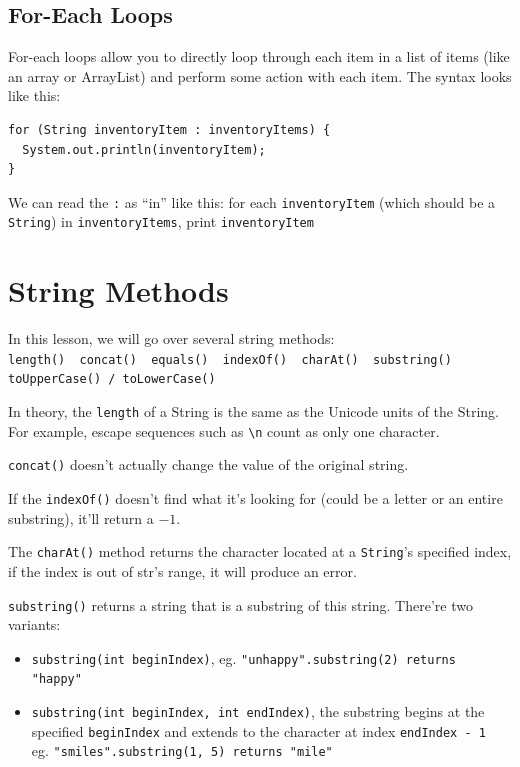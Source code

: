 \documentclass[a4paper, 12pt]{article}
\begin{document}
\subsection{For-Each Loops}
For-each loops allow you to directly loop through each item in a list of items (like an array or ArrayList) and perform some action with each item. The syntax looks like this:
\begin{verbatim}
for (String inventoryItem : inventoryItems) {
  System.out.println(inventoryItem);
}
\end{verbatim}
We can read the \verb|:| as ``in'' like this: for each \verb|inventoryItem| (which should be a \verb|String|) in \verb|inventoryItems|, print \verb|inventoryItem|


\section{String Methods}
In this lesson, we will go over several string methods:\\
\verb|length()  concat()  equals()  indexOf()  charAt()  substring()|\\
\verb|toUpperCase() / toLowerCase()|

In theory, the \verb|length| of a String is the same as the Unicode units of the String. For example, escape sequences such as \verb|\n| count as only one character.

\verb|concat()| doesn't actually change the value of the original string.

If the \verb|indexOf()| doesn't find what it's looking for (could be a letter or an entire substring), it'll return a $-1$.

The \verb|charAt()| method returns the character located at a \verb|String|'s specified index, if the index is out of str's range, it will produce an error.

\verb|substring()| returns a string that is a substring of this string. There're two variants:
\begin{itemize}
\item \verb|substring(int beginIndex)|, eg. \verb|"unhappy".substring(2) returns "happy"|

\item \verb|substring(int beginIndex, int endIndex)|, the substring begins at the specified \verb|beginIndex| and extends to the character at index \verb|endIndex - 1|\\ eg. \verb|"smiles".substring(1, 5) returns "mile"|

\end{itemize}
\end{document}
